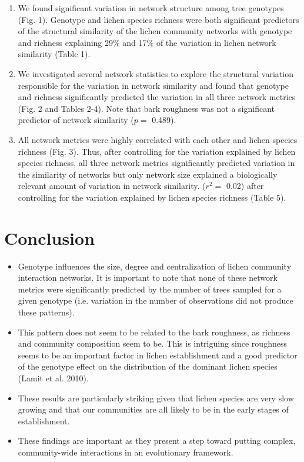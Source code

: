 \documentclass[11pt]{amsart}
\begin{document}
\begin{enumerate}
\item We found significant variation in network structure among tree
  genotypes (Fig. 1). Genotype and lichen species richness were both
  significant predictors of the structural similarity of the lichen community networks with genotype
  and richness explaining
  29\% and
  17\% of the
  variation in lichen network similarity (Table 1). 
\item We investigated several network statistics to explore the
  structural variation responsible for the variation in network
  similarity and found that genotype and richness significantly
  predicted the variation in all three network metrics (Fig. 2 and
  Tables 2-4). Note that bark roughness was not a significant
  predictor of network similarity ($p = $ 0.489).
\item  All network metrics were highly correlated with each other and
  lichen species richness (Fig. 3). Thus, after controlling for the variation explained by lichen
  species richness, all three network metrics significantly
  predicted variation in the similarity of networks but only
  network size explained a biologically relevant amount of variation
  in network similarity.  ($r^2 = $
  0.02) after
  controlling for the variation explained by lichen species richness
  (Table 5).
\end{enumerate}


\section{Conclusion}

\begin{itemize}
\item Genotype influences the size, degree and centralization of
  lichen community interaction networks. It is important to note
  that none of these network metrics were significantly predicted by
  the number of trees sampled for a given genotype (i.e. variation in
  the number of observations did not produce these patterns). 
\item This pattern does not seem to be related to the bark roughness,
  as richness and community composition seem to be. This is
  intriguing since roughness seems to be an important
  factor in lichen establishment and a good predictor of the genotype
  effect on the distribution of the dominant lichen species (Lamit et
  al. 2010).
\item These results are particularly striking given that lichen
  species are very slow growing and that our communities are all
  likely to be in the early stages of establishment.
\item These findings are important as they present a
  step toward putting complex, community-wide
  interactions in an evolutionary framework.
\end{itemize}
\end{document}
